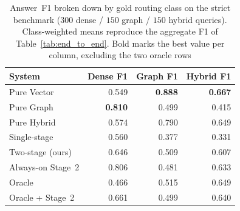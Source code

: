 \documentclass[pdflatex,sn-mathphys-num]{sn-jnl}
\begin{document}
\begin{table}[!htbp]
\centering
\caption{Answer~F1 broken down by gold routing class on the strict benchmark
($300$ dense / $150$ graph / $150$ hybrid queries). Class-weighted means
reproduce the aggregate F1 of Table~\ref{tab:end_to_end}. Bold marks the best
value per column, excluding the two oracle rows}\label{tab:per_class_f1}
\begin{tabular}{lrrr}
\toprule
\textbf{System} & \textbf{Dense F1} & \textbf{Graph F1} & \textbf{Hybrid F1} \\
\midrule
Pure Vector      & 0.549 & \textbf{0.888} & \textbf{0.667} \\
Pure Graph       & \textbf{0.810} & 0.499 & 0.415 \\
Pure Hybrid      & 0.574 & 0.790 & 0.649 \\
Single-stage     & 0.560 & 0.377 & 0.331 \\
Two-stage (ours) & 0.646 & 0.509 & 0.607 \\
Always-on Stage~2 & 0.806 & 0.481 & 0.633 \\
\midrule
Oracle           & 0.466 & 0.515 & 0.649 \\
Oracle + Stage~2 & 0.661 & 0.499 & 0.640 \\
\bottomrule
\end{tabular}
\end{table}
\end{document}
